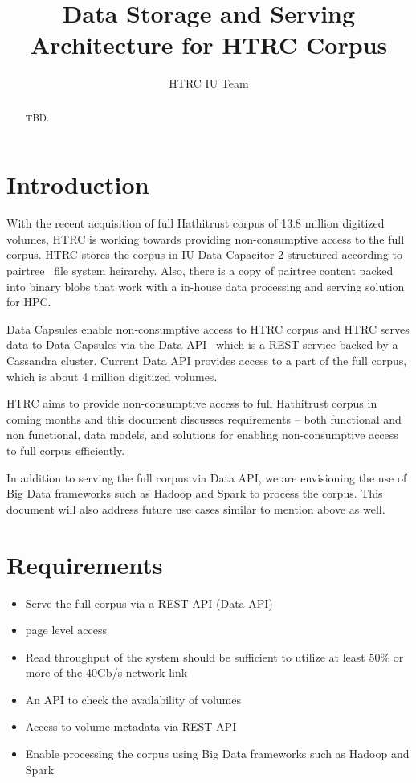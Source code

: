 \documentclass[tikz, border=5pt]{thesis}
\title{Data Storage and Serving Architecture for HTRC Corpus}
\author{HTRC IU Team}
\begin{document}
\maketitle

\tableofcontents

\begin{abstract}
TBD.
\end{abstract}

\section{Introduction}
With the recent acquisition of full Hathitrust corpus of 13.8 million digitized volumes, HTRC is working towards providing non-consumptive access to the full corpus. HTRC stores the corpus in IU Data Capacitor 2 structured according to pairtree~\cite{pairtree} file system heirarchy. Also, there is a copy of pairtree content packed into binary blobs that work with a in-house data processing and serving solution for HPC.

Data Capsules enable non-consumptive access to HTRC corpus and HTRC serves data to Data Capsules via the Data API~\cite{dataapi} which is a REST service backed by a Cassandra cluster. Current Data API provides access to a part of the full corpus, which is about 4 million digitized volumes.

HTRC aims to provide non-consumptive access to full Hathitrust corpus in coming months and this document discusses requirements -- both functional and non functional, data models, and solutions for enabling non-consumptive access to full corpus efficiently.

In addition to serving the full corpus via Data API, we are envisioning the use of Big Data frameworks such as Hadoop and Spark to process the corpus. This document will also address future use cases similar to mention above as well.

\section{Requirements}

\begin{itemize}
	\item Serve the full corpus via a REST API (Data API)
	\item 
	page level access 
	\item Read throughput of the system should be sufficient to utilize at least 50\% or more of the 40Gb/s network link
	\item An API to check the availability of volumes
	\item Access to volume metadata via REST API
	\item Enable processing the corpus using Big Data frameworks such as Hadoop and Spark
\end{itemize}
    
\end{document}
